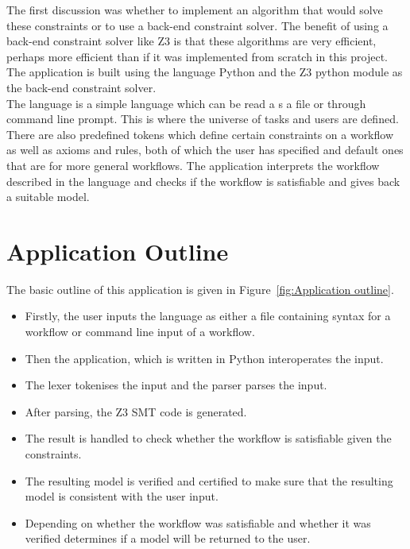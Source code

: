 \documentclass[a4paper]{report}
\begin{document}
The first discussion was whether to implement an algorithm that would solve these constraints or to use a back-end constraint solver. The benefit of using a back-end constraint solver like Z3 is that these algorithms are very efficient, perhaps more efficient than if it was implemented from scratch in this project. The application is built using the language  Python\cite{python} and the Z3 python module\cite{Z3Python} as the back-end constraint solver. \\

The language is a simple language which can be read a s a file or through command line prompt. This is where the universe of tasks and users are defined. There are also predefined tokens which define certain constraints on a workflow as well as axioms and rules, both of which the user has specified and default ones that are for more general workflows. The application interprets the workflow described in the language and checks if the workflow is satisfiable and gives back a suitable model.\\

\section{Application Outline}
The basic outline of this application is given in Figure~\ref{fig:Application outline}.
\begin{itemize}
\item Firstly, the user inputs the language as either a file containing syntax for a workflow or command line input of a workflow.
\item Then the application, which is written in Python interoperates the input.
\item The lexer tokenises the input and the parser parses the input.
\item After parsing, the Z3 SMT code is generated.
\item The result is handled to check whether the workflow is satisfiable given the constraints.
\item The resulting model is verified and certified to make sure that the resulting model is consistent with the user input.
\item Depending on whether the workflow was satisfiable and whether it was verified determines if a model will be returned to the user.
\end{itemize}
\end{document}
